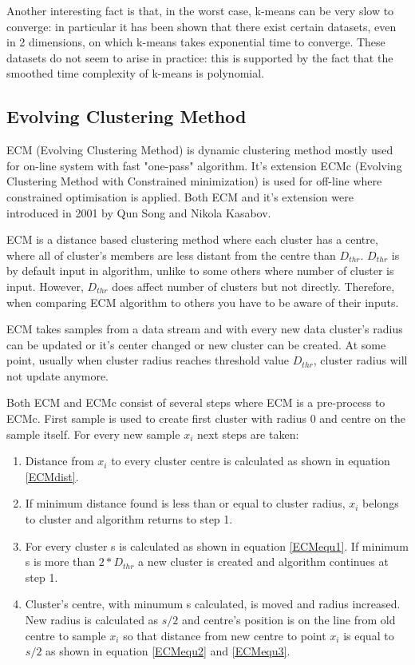 \documentclass[conference]{IEEEtran}
\begin{document}
Another interesting fact is that, in the worst case, k-means can be very slow to converge:
in particular it has been shown that there exist certain datasets,
even in 2 dimensions, on which k-means takes exponential time to converge.
These datasets do not seem to arise in practice: this is supported by the
fact that the smoothed time complexity of k-means is polynomial.

\subsection{Evolving Clustering Method}

ECM (Evolving Clustering Method) is dynamic clustering method mostly used for on-line system with fast "one-pass" algorithm. It's extension ECMc (Evolving Clustering Method with Constrained minimization) is used for off-line where constrained optimisation is applied. Both ECM and it's extension were introduced in 2001 by Qun Song and Nikola Kasabov.

ECM is a distance based clustering method where each cluster has a centre, where all of cluster's members are less distant from the centre than $D_{thr}$. $D_{thr}$ is by default input in algorithm, unlike to some others where number of cluster is input. However, $D_{thr}$ does affect number of clusters but not directly. Therefore, when comparing ECM algorithm to others you have to be aware of their inputs.

ECM takes samples from a data stream and with every new data cluster's radius can be updated or it's center changed or new cluster can be created. At some point, usually when cluster radius reaches threshold value $D_{thr}$, cluster radius will not update anymore.

Both ECM and ECMc consist of several steps where ECM is a pre-process to ECMc. First sample is used to create first cluster with radius 0 and centre on the sample itself. For every new sample $x_i$ next steps are taken:
\begin{enumerate}
\item Distance from $x_i$ to every cluster centre is calculated as shown in equation \ref{ECMdist}.
\item If minimum distance found is less than or equal to cluster radius, $x_i$ belongs to cluster and algorithm returns to step 1.
\item For every cluster s is calculated as shown in equation \ref{ECMequ1}. If minimum s is more than $2*D_{thr}$ a new cluster is created and algorithm continues at step 1.
\item Cluster's centre, with minumum s calculated, is moved and radius increased. New radius is calculated as $s/2$ and centre's position is on the line from old centre to sample $x_i$ so that distance from new centre to point $x_i$ is equal to $s/2$ as shown in equation \ref{ECMequ2} and \ref{ECMequ3}.
\end{enumerate}
\end{document}
